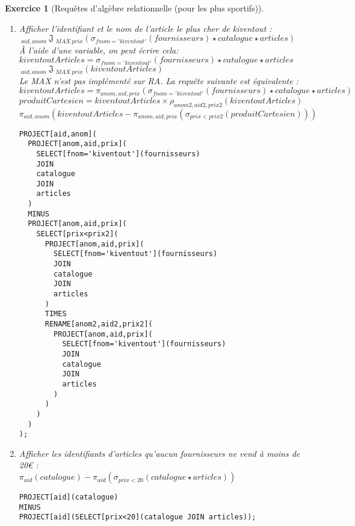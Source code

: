 \documentclass{article}
\theoremstyle{exostyle}
\newtheorem{exercice}{Exercice}
\newenvironment{questions}{

\begin{enumerate}[\hspace{12pt}\bfseries\itshape 1.]}{
\end{enumerate}

} %
\begin{document}
\begin{exercice}[Requêtes d'algèbre relationnelle (pour les plus sportifs)]
\begin{questions}
\item Afficher l'identifiant et le nom de l'article le plus cher de kiventout :\\
$\ _{aid,anom}\ \mathfrak{J}\ _{MAX\ prix}(\sigma_{fnom='kiventout'}(fournisseurs) \star catalogue \star articles)$\\
\`A l'aide d'une variable, on peut écrire cela:\\
$kiventoutArticles = \sigma_{fnom='kiventout'}(fournisseurs) \star catalogue \star articles$\\
$\ _{aid,anom}\ \mathfrak{J}\ _{MAX\ prix}(kiventoutArticles)$\\
Le MAX n'est pas implémenté sur RA. La requête suivante est équivalente :\\
$kiventoutArticles = \pi_{anom,aid,prix}(\sigma_{fnom='kiventout'}(fournisseurs) \star catalogue \star articles)$\\
$produitCartesien = kiventoutArticles \times \rho_{anom2,aid2,prix2}(kiventoutArticles)$\\
$\pi_{aid,anom}(kiventoutArticles - \pi_{anom,aid,prix}(\sigma_{prix<prix2}(produitCartesien)))$
\begin{verbatim}
PROJECT[aid,anom](
  PROJECT[anom,aid,prix](
    SELECT[fnom='kiventout'](fournisseurs)
    JOIN
    catalogue
    JOIN
    articles
  )
  MINUS
  PROJECT[anom,aid,prix](
    SELECT[prix<prix2](
      PROJECT[anom,aid,prix](
        SELECT[fnom='kiventout'](fournisseurs)
        JOIN
        catalogue
        JOIN
        articles
      )
      TIMES
      RENAME[anom2,aid2,prix2](
        PROJECT[anom,aid,prix](
          SELECT[fnom='kiventout'](fournisseurs)
          JOIN
          catalogue
          JOIN
          articles
        )
      )
    )
  )
);
\end{verbatim}

\item Afficher les identifiants d'articles qu'aucun fournisseurs ne vend à moins de 20\euro{} :\\
$\pi_{aid}(catalogue) - \pi_{aid}(\sigma_{prix<20}(catalogue \star articles))$
\begin{verbatim}
PROJECT[aid](catalogue)
MINUS
PROJECT[aid](SELECT[prix<20](catalogue JOIN articles));
\end{verbatim}


\end{questions}
\end{exercice}
\end{document}
